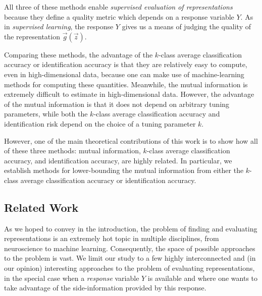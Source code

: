 All three of these methods enable \emph{supervised evaluation of
  representations} because they define a quality metric which depends
on a response variable $Y$.  As in \emph{supervised learning}, the
response $Y$ gives us a means of judging the quality of the
representation $\vec{g}(\vec{z})$.

Comparing these methods, the advantage of the $k$-class average
classification accuracy or identification accuracy is that they are
relatively easy to compute, even in high-dimensional data, because one
can make use of machine-learning methods for computing these
quantities.  Meanwhile, the mutual information is extremely difficult
to estimate in high-dimensional data.  However, the advantage of the
mutual information is that it does not depend on arbitrary tuning
parameters, while both the $k$-class average classification accuracy
and identification risk depend on the choice of a tuning parameter
$k$.

However, one of the main theoretical contributions of this work is to
show how all of these three methods: mutual information, $k$-class
average classification accuracy, and identification accuracy, are
highly related.  In particular, we establish methods for
lower-bounding the mutual information from either the $k$-class
average classification accuracy or identification accuracy.

\subsection{Related Work}

As we hoped to convey in the introduction, the problem of finding and
evaluating representations is an extremely hot topic in multiple
disciplines, from neuroscience to machine learning.  Consequently, the
space of possible approaches to the problem is vast.  We limit our
study to a few highly interconnected and (in our opinion) interesting
approaches to the problem of evaluating representations, in the
special case when a \emph{response} variable $Y$ is available and
where one wants to take advantage of the side-information provided by
this response.


